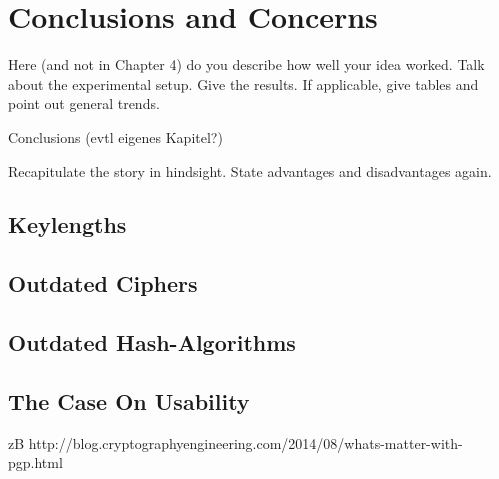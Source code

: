 \chapter{Conclusions and Concerns}

Here (and not in Chapter 4) do you describe how well your idea
worked. Talk about the experimental setup. Give the results. If
applicable, give tables and point out general trends.

Conclusions (evtl eigenes Kapitel?)

Recapitulate the story in hindsight. State advantages and
disadvantages again.

\section{Keylengths}

\section{Outdated Ciphers}

\section{Outdated Hash-Algorithms}

\section{The Case On Usability}

zB
http://blog.cryptographyengineering.com/2014/08/whats-matter-with-pgp.html